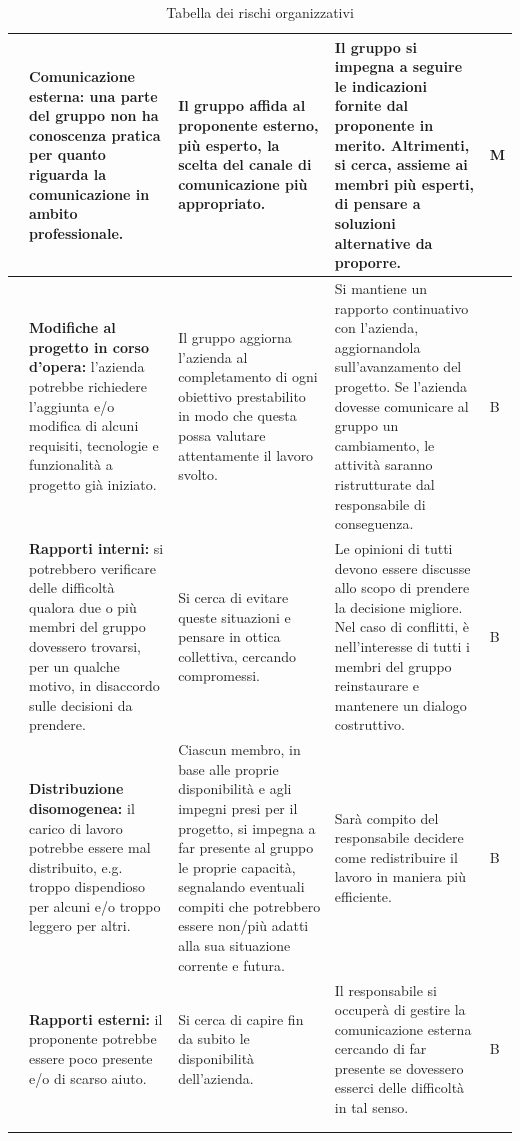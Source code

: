 \begin{xltabular}{\textwidth}{p{0.00001\textwidth} X | X | X | p{0.05\textwidth}}
    & \textbf{Comunicazione esterna:} una parte del gruppo non ha conoscenza pratica per quanto riguarda la comunicazione in ambito professionale.
    & Il gruppo affida al proponente esterno, più esperto, la scelta del canale di comunicazione più appropriato.
    & Il gruppo si impegna a seguire le indicazioni fornite dal proponente in merito. Altrimenti, si cerca, assieme ai membri più esperti, di pensare a soluzioni alternative da proporre.
    & M \\
    \hline

    & \textbf{Modifiche al progetto in corso d'opera:} l'azienda potrebbe richiedere l'aggiunta e/o modifica di alcuni requisiti, tecnologie e funzionalità a progetto già iniziato.
    & Il gruppo aggiorna l'azienda al completamento di ogni obiettivo prestabilito in modo che questa possa valutare attentamente il lavoro svolto.
    & Si mantiene un rapporto continuativo con l'azienda, aggiornandola sull'avanzamento del progetto. Se l'azienda dovesse comunicare al gruppo un cambiamento, le attività saranno ristrutturate dal responsabile di conseguenza.
    & B \\
    \hline

    & \textbf{Rapporti interni:} si potrebbero verificare delle difficoltà qualora due o più membri del gruppo dovessero trovarsi, per un qualche motivo, in disaccordo sulle decisioni da prendere.
    & Si cerca di evitare queste situazioni e pensare in ottica collettiva, cercando compromessi.
    & Le opinioni di tutti devono essere discusse allo scopo di prendere la decisione migliore. Nel caso di conflitti, è nell'interesse di tutti i membri del gruppo reinstaurare e mantenere un dialogo costruttivo.
    & B \\
    \hline

    & \textbf{Distribuzione disomogenea:} il carico di lavoro potrebbe essere mal distribuito, e.g. troppo dispendioso per alcuni e/o troppo leggero per altri. 
    & Ciascun membro, in base alle proprie disponibilità e agli impegni presi per il progetto, si impegna a far presente al gruppo le proprie capacità, segnalando eventuali compiti che potrebbero essere non/più adatti alla sua situazione corrente e futura.
    & Sarà compito del responsabile decidere come redistribuire il lavoro in maniera più efficiente.
    & B \\
    \hline

    & \textbf{Rapporti esterni: } il proponente potrebbe essere poco presente e/o di scarso aiuto.
    & Si cerca di capire fin da subito le disponibilità dell'azienda.
    & Il responsabile si occuperà di gestire la comunicazione esterna cercando di far presente se dovessero esserci delle difficoltà in tal senso.
    & B \\
    \hline \\

    \caption{Tabella dei rischi organizzativi}
    \label{tab:rischi:org}
\end{xltabular}

